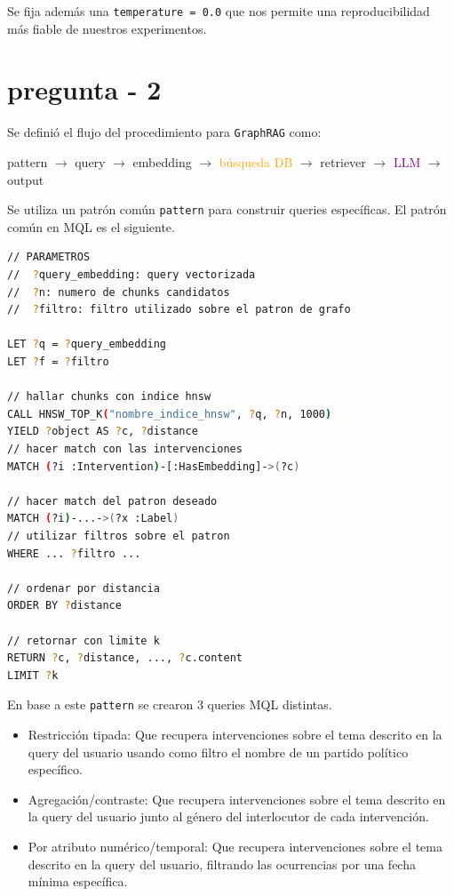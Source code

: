 \documentclass{article}
\begin{document}
Se fija además una \texttt{temperature = 0.0} que nos permite una reproducibilidad más fiable de nuestros experimentos.

\newpage
\section*{pregunta - 2}

Se definió el flujo del procedimiento para \texttt{GraphRAG} como:

\begin{mdframed}[style=simplebox]
pattern $\rightarrow$ query $\rightarrow$ embedding $\rightarrow$ \textcolor{orange}{búsqueda DB} $\rightarrow$ retriever $\rightarrow$ \textcolor{purple}{LLM} $\rightarrow$ output
\end{mdframed}

Se utiliza un patrón común \texttt{pattern} para construir queries específicas. El patrón común en MQL es el siguiente.

\begin{lstlisting}[language=Bash]
// PARAMETROS
//  ?query_embedding: query vectorizada
//  ?n: numero de chunks candidatos
//  ?filtro: filtro utilizado sobre el patron de grafo

LET ?q = ?query_embedding
LET ?f = ?filtro

// hallar chunks con indice hnsw
CALL HNSW_TOP_K("nombre_indice_hnsw", ?q, ?n, 1000)
YIELD ?object AS ?c, ?distance
// hacer match con las intervenciones
MATCH (?i :Intervention)-[:HasEmbedding]->(?c)

// hacer match del patron deseado
MATCH (?i)-...->(?x :Label)
// utilizar filtros sobre el patron
WHERE ... ?filtro ...

// ordenar por distancia
ORDER BY ?distance

// retornar con limite k
RETURN ?c, ?distance, ..., ?c.content
LIMIT ?k
\end{lstlisting}

En base a este \texttt{pattern} se crearon 3 queries MQL distintas.

\begin{itemize}
    \item Restricción tipada: Que recupera intervenciones sobre el tema descrito en la query del usuario usando como filtro el nombre de un partido político específico.
    \item Agregación/contraste: Que recupera intervenciones sobre el tema descrito en la query del usuario junto al género del interlocutor de cada intervención.
    \item Por atributo numérico/temporal: Que recupera intervenciones sobre el tema descrito en la query del usuario, filtrando las ocurrencias por una fecha mínima específica.
\end{itemize}
\end{document}
